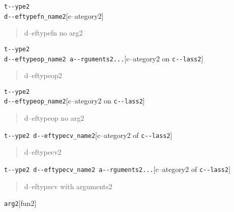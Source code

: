 \documentclass{book}
\begin{document}
\begin{titlepage}
\noindent\texttt{t{-}{-}ype2\leavevmode{}\\d{-}{-}eftypefn\_name2}\hfill[c--ategory2]



%
\begin{quote}
\unskip{\parskip=0pt\noindent}%
d--eftypefn no arg2
\end{quote}

\noindent\texttt{t{-}{-}ype2\leavevmode{}\\d{-}{-}eftypeop\_name2 a{-}{-}rguments2...}\hfill[c--ategory2 on \texttt{c{-}{-}lass2}]



%
\begin{quote}
\unskip{\parskip=0pt\noindent}%
d--eftypeop2
\end{quote}

\noindent\texttt{t{-}{-}ype2\leavevmode{}\\d{-}{-}eftypeop\_name2}\hfill[c--ategory2 on \texttt{c{-}{-}lass2}]



%
\begin{quote}
\unskip{\parskip=0pt\noindent}%
d--eftypeop no arg2
\end{quote}

\noindent\texttt{t{-}{-}ype2 d{-}{-}eftypecv\_name2}\hfill[c--ategory2 of \texttt{c{-}{-}lass2}]



%
\begin{quote}
\unskip{\parskip=0pt\noindent}%
d--eftypecv2
\end{quote}

\noindent\texttt{t{-}{-}ype2 d{-}{-}eftypecv\_name2 a{-}{-}rguments2...}\hfill[c--ategory2 of \texttt{c{-}{-}lass2}]



%
\begin{quote}
\unskip{\parskip=0pt\noindent}%
d--eftypecv with arguments2
\end{quote}

\noindent\texttt{arg2}\hfill[fun2]




\end{titlepage}
\end{document}
